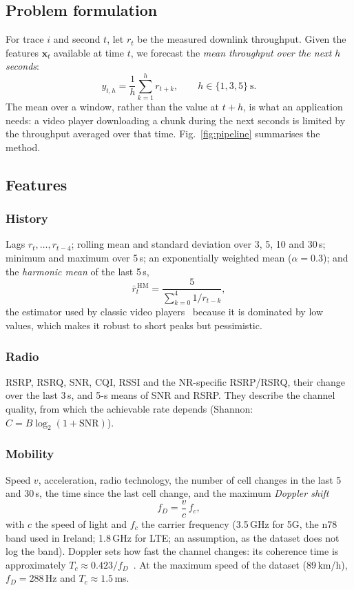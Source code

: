 \documentclass[10pt,a4paper,twocolumn]{article}
\newcommand{\x}{\bm{x}}
\begin{document}
\subsection{Problem formulation}
For trace $i$ and second $t$, let $r_t$ be the measured downlink throughput. Given the
features $\x_t$ available at time $t$, we forecast the \emph{mean throughput over the next
$h$ seconds}:
\begin{equation}
y_{t,h}=\frac{1}{h}\sum_{k=1}^{h} r_{t+k},\qquad h\in\{1,3,5\}\ \text{s}.
\label{eq:target}
\end{equation}
The mean over a window, rather than the value at $t+h$, is what an application needs: a
video player downloading a chunk during the next seconds is limited by the throughput
averaged over that time. Fig.~\ref{fig:pipeline} summarises the method.

\subsection{Features}
\subsubsection{History}
Lags $r_t,\dots,r_{t-4}$; rolling mean and standard deviation over 3, 5, 10 and 30\,s;
minimum and maximum over 5\,s; an exponentially weighted mean ($\alpha=0.3$); and the
\emph{harmonic mean} of the last 5\,s,
\begin{equation}
\bar r^{\,\text{HM}}_t=\frac{5}{\sum_{k=0}^{4} 1/r_{t-k}},
\end{equation}
the estimator used by classic video players~\cite{yin2015} because it is dominated by low
values, which makes it robust to short peaks but pessimistic.

\subsubsection{Radio}
RSRP, RSRQ, SNR, CQI, RSSI and the NR-specific RSRP/RSRQ, their change over the last
3\,s, and 5-s means of SNR and RSRP. They describe the channel quality, from which the
achievable rate depends (Shannon: $C=B\log_2(1+\text{SNR})$).

\subsubsection{Mobility}
Speed $v$, acceleration, radio technology, the number of cell changes in the last 5 and
30\,s, the time since the last cell change, and the maximum \emph{Doppler shift}
\begin{equation}
f_D=\frac{v}{c}\,f_c,
\label{eq:doppler}
\end{equation}
with $c$ the speed of light and $f_c$ the carrier frequency (3.5\,GHz for 5G, the n78 band
used in Ireland; 1.8\,GHz for LTE; an assumption, as the dataset does not log the band).
Doppler sets how fast the channel changes: its coherence time is approximately
$T_c\approx 0.423/f_D$~\cite{rappaport}. At the maximum speed of the dataset (89\,km/h),
$f_D=288$\,Hz and $T_c\approx1.5$\,ms.
\end{document}
